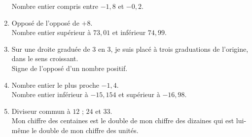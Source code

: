 \begin{enigme}
\begin{multicols}{2}
\begin{enumerate}
                Nombre entier compris entre $-1,8$ et $-0,2$. \\
            \item Opposé de l’opposé de $+8$. \\
                Nombre entier supérieur à $73,01$ et inférieur $74,99$. \\
            \item Sur une droite graduée de $3$ en $3$, je suis placé à trois graduations de l'origine, dans le sens croissant. \\
                Signe de l’opposé d'un nombre positif. \\
            \item Nombre entier le plus proche $-1,4$. \\
                Nombre entier inférieur à $-15,154$ et supérieur à $-16,98$. \\
            \item Diviseur commun à $12$ ; $24$ et $33$. \\
                Mon chiffre des centaines est le double de mon chiffre des dizaines qui est lui-même le double de mon chiffre des unités. \\ [1mm]
        \end{enumerate}
        

\end{multicols}
\end{enigme}
